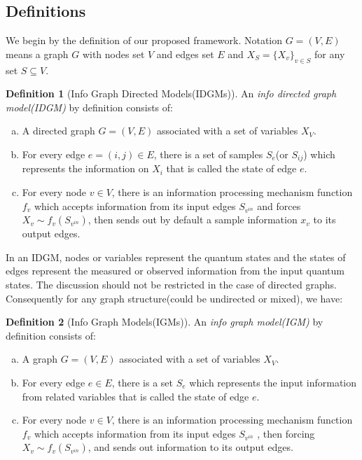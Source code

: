 \documentclass{article}
\theoremstyle{definition}
\newtheorem{definition}{Definition}[section]
\theoremstyle{remark}
\theoremstyle{definition}
\begin{document}
\begin{CJK*}{UTF8}{gbsn}

\subsection{Definitions}

We begin by the definition of our proposed framework. Notation $G=(V, E)$ means a graph $G$ with nodes set $V$ and edges set $E$ and $X_S = \{X_v\}_{v\in S}$ for any set $S\subseteq V$.

\begin{definition}[Info Graph Directed Models(IDGMs)]
    An \emph{info directed graph model(IDGM)} by definition consists of:
    \begin{enumerate}[a)]
        \item  A directed graph $G = (V, E)$ associated with a set of variables $X_V$. 
        \item  For every edge $e=(i, j) \in E$, there is a set of samples $S_e$(or $S_{ij}$) which represents the information on $X_i$ that is called the state of edge $e$. 
        \item  For every node $v \in V$, there is an information processing mechanism function $f_v$ which accepts information from its input edges $S_{v^{in}}$ and forces $X_v \sim f_v(S_{v^{in}})$, then sends out by default a sample information $x_v$ to its output edges. 
    \end{enumerate}  
\end{definition}


In an IDGM, nodes or variables  represent the quantum states and the states of edges represent the measured or observed information from the input quantum states. The discussion should not be restricted in the case of directed graphs. Consequently for any graph structure(could be undirected or mixed), we have:

\begin{definition}[Info Graph Models(IGMs)]
    An \emph{info graph model(IGM)} by definition consists of:
    \begin{enumerate}[a)]
        \item  A graph $G = (V, E)$ associated with a set of variables $X_V$. 
        \item  For every edge $e \in E$, there is a set $S_e$ which represents the input information from related variables that is called the state of edge $e$. 
        \item  For every node $v \in V$, there is an information processing mechanism function $f_v$ which accepts information from its input edges $S_{v^{in}}$ , then forcing $X_v \sim f_v(S_{v^{in}})$, and sends out information to its output edges. 
    \end{enumerate}  
\end{definition}


\end{CJK*}
\end{document}
